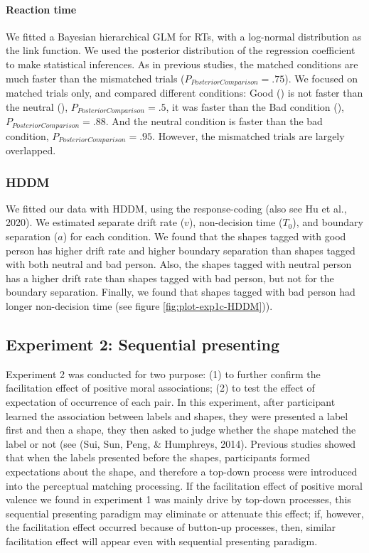 \documentclass[
  english,
  man]{apa6}
\let\oldparagraph\paragraph
\renewcommand{\paragraph}[1]{\oldparagraph{#1}\mbox{}}
\begin{document}
\hypertarget{reaction-time-1}{%
\paragraph{Reaction time}\label{reaction-time-1}}

We fitted a Bayesian hierarchical GLM for RTs, with a log-normal distribution as the link function. We used the posterior distribution of the regression coefficient to make statistical inferences. As in previous studies, the matched conditions are much faster than the mismatched trials (\(P_{PosteriorComparison} = .75\)). We focused on matched trials only, and compared different conditions: Good () is not faster than the neutral (), \(P_{PosteriorComparison} = .5\), it was faster than the Bad condition (), \(P_{PosteriorComparison} = .88\). And the neutral condition is faster than the bad condition, \(P_{PosteriorComparison} = .95\). However, the mismatched trials are largely overlapped.

\hypertarget{hddm-2}{%
\subsubsection{HDDM}\label{hddm-2}}

We fitted our data with HDDM, using the response-coding (also see Hu et al., 2020). We estimated separate drift rate (\(v\)), non-decision time (\(T_{0}\)), and boundary separation (\(a\)) for each condition. We found that the shapes tagged with good person has higher drift rate and higher boundary separation than shapes tagged with both neutral and bad person. Also, the shapes tagged with neutral person has a higher drift rate than shapes tagged with bad person, but not for the boundary separation. Finally, we found that shapes tagged with bad person had longer non-decision time (see figure \ref{fig:plot-exp1c-HDDM})).

\hypertarget{experiment-2-sequential-presenting}{%
\subsection{Experiment 2: Sequential presenting}\label{experiment-2-sequential-presenting}}

Experiment 2 was conducted for two purpose: (1) to further confirm the facilitation effect of positive moral associations; (2) to test the effect of expectation of occurrence of each pair. In this experiment, after participant learned the association between labels and shapes, they were presented a label first and then a shape, they then asked to judge whether the shape matched the label or not (see (Sui, Sun, Peng, \& Humphreys, 2014). Previous studies showed that when the labels presented before the shapes, participants formed expectations about the shape, and therefore a top-down process were introduced into the perceptual matching processing. If the facilitation effect of positive moral valence we found in experiment 1 was mainly drive by top-down processes, this sequential presenting paradigm may eliminate or attenuate this effect; if, however, the facilitation effect occurred because of button-up processes, then, similar facilitation effect will appear even with sequential presenting paradigm.
\end{document}

